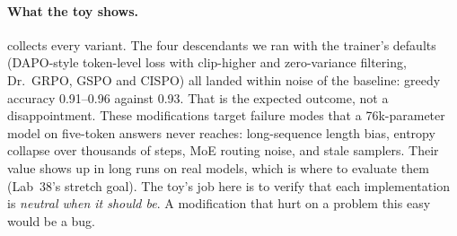 \paragraph{What the toy shows.}  collects every variant. The four
descendants we ran with the trainer's defaults (DAPO-style token-level loss with clip-higher
and zero-variance filtering, Dr.~GRPO, GSPO and CISPO) all landed within noise of the
baseline: greedy accuracy 0.91--0.96 against 0.93. That is the expected outcome, not a
disappointment. These modifications target failure modes that a 76k-parameter model on
five-token answers never reaches: long-sequence length bias, entropy collapse over thousands
of steps, MoE routing noise, and stale samplers. Their value shows up in long runs on real
models, which is where to evaluate them (Lab~38's stretch goal). The toy's job here is to
verify that each implementation is \emph{neutral when it should be}. A modification that hurt
on a problem this easy would be a bug.

